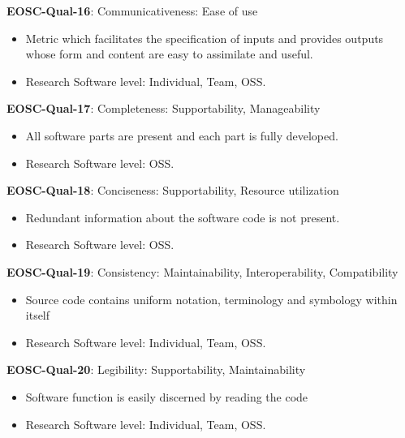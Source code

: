 \textbf{EOSC-Qual-16}: Communicativeness: Ease of use

\begin{itemize}
    \item Metric which facilitates the specification of inputs and provides outputs whose form and content are easy to assimilate and useful. \cite{boehm_quantitative_1976,raymond_software_2013}
    \item Research Software level: Individual, Team, OSS.
\end{itemize}

\textbf{EOSC-Qual-17}: Completeness: Supportability, Manageability

\begin{itemize}
    \item All software parts are present and each part is fully developed. \cite{iso_25010_2011_2017,boehm_quantitative_1976}
    \item Research Software level: OSS.
\end{itemize}

\textbf{EOSC-Qual-18}: Conciseness: Supportability, Resource utilization

\begin{itemize}
    \item Redundant information about the software code is not present. \cite{boehm_quantitative_1976}
    \item Research Software level: OSS.
\end{itemize}

\textbf{EOSC-Qual-19}: Consistency: Maintainability, Interoperability, Compatibility

\begin{itemize}
    \item Source code contains uniform notation, terminology and symbology within itself \cite{boehm_quantitative_1976,raymond_software_2013}
    \item Research Software level: Individual, Team, OSS.
\end{itemize}

\textbf{EOSC-Qual-20}: Legibility: Supportability, Maintainability

\begin{itemize}
    \item Software function is easily discerned by reading the code \cite{boehm_quantitative_1976}
    \item Research Software level: Individual, Team, OSS.
\end{itemize}

